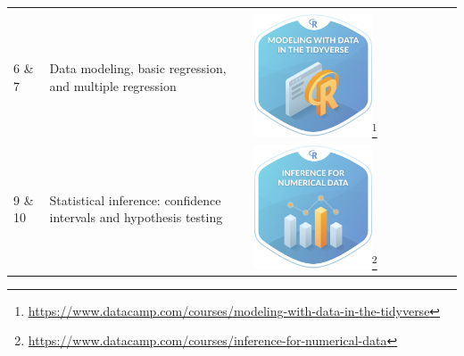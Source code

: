 \documentclass[12pt,]{krantz}
\renewcommand{\href}[2]{#2\footnote{\url{#1}}}
\begin{document}
\begin{longtable}[]{@{}lll@{}}
\begin{minipage}[t]{0.30\columnwidth}
\end{minipage}\tabularnewline
\begin{minipage}[t]{0.30\columnwidth}\raggedright\strut
6 \& 7\strut
\end{minipage} & \begin{minipage}[t]{0.30\columnwidth}\raggedright\strut
Data modeling, basic regression, and multiple regression\strut
\end{minipage} & \begin{minipage}[t]{0.30\columnwidth}\raggedright\strut
\href{https://www.datacamp.com/courses/modeling-with-data-in-the-tidyverse}{\includegraphics[width=0.6\textwidth]{images/datacamp_intro_to_modeling.png}}\strut
\end{minipage}\tabularnewline
\begin{minipage}[t]{0.30\columnwidth}\raggedright\strut
9 \& 10\strut
\end{minipage} & \begin{minipage}[t]{0.30\columnwidth}\raggedright\strut
Statistical inference: confidence intervals and hypothesis testing\strut
\end{minipage} & \begin{minipage}[t]{0.30\columnwidth}\raggedright\strut
\href{https://www.datacamp.com/courses/inference-for-numerical-data}{\includegraphics[width=0.6\textwidth]{images/datacamp_inference_for_numerical_data.png}}

\end{minipage}
\end{longtable}
\end{document}
